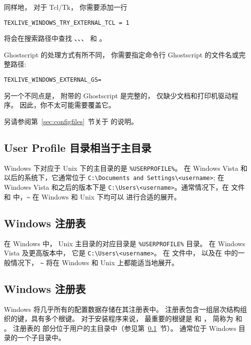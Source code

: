 \documentclass{article}
\begin{document}
同样地，
对于 Tcl/Tk，
你需要添加一行
\begin{verbatim}
TEXLIVE_WINDOWS_TRY_EXTERNAL_TCL = 1
\end{verbatim}
\TL{} 将会在搜索路径中查找 、、、 和 。

Ghostscript 的处理方式有所不同，
你需要指定命令行 Ghostscript 的文件名或完整路径: 
\begin{alltt}
TEXLIVE_WINDOWS_EXTERNAL_GS = 
\end{alltt}
另一个不同点是，
\TL{} 附带的 Ghostscript 是完整的，
仅缺少文档和打印机驱动程序。
因此，你不太可能需要覆盖它。

另请参阅第~\ref{sec:configfiles}~节关于  的说明。


\subsection{User Profile 目录相当于主目录}
\label{sec:winhome}

Windows 下对应于 Unix 下的主目录的是 \verb|%USERPROFILE%|。
在 Windows Vista 和以后的系统下，它通常位于
\verb|C:\Documents and Settings\<username>|; 
在 Windows Vista 和之后的版本下是 \verb|C:\Users\<username>|。通常情况下，在
 文件和 \KPS{} 中，\verb|~| 在 Windows 和 Unix 下均可以
进行合适的展开。

\subsection{Windows 注册表}
\label{sec:registry}

在 Windows 中，
Unix 主目录的对应目录是 \verb|%USERPROFILE%| 目录。
在 Windows Vista 及更高版本中，
它是 \verb|C:\Users\<username>|。
在  文件中，
以及在 \KPS{} 中的一般情况下，
\verb|~| 将在 Windows 和 Unix 上都能适当地展开。

\subsection{Windows 注册表}
\label{sec:registry}

Windows 将几乎所有的配置数据存储在其注册表中。
注册表包含一组层次结构组织的键，具有多个根键。
对于安装程序来说，
最重要的根键是  和 ，
简称为  和 。
注册表的  部分位于用户的主目录中（参见第~\ref{sec:winhome}~节）。
 通常位于 Windows 目录的一个子目录中。
\end{document}
